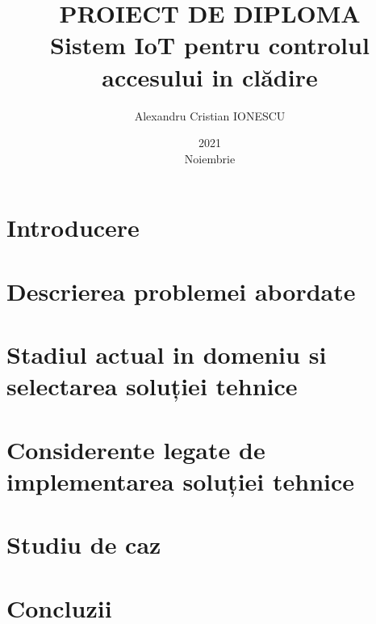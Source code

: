 \documentclass[12pt,romanian]{report}
\title{PROIECT DE DIPLOMA\\Sistem IoT pentru controlul\\accesului in clădire}
\date{2021\\ Noiembrie}
\author{Alexandru Cristian IONESCU}
\begin{document}
\maketitle


\tableofcontents

\chapter{Introducere}


\chapter{Descrierea problemei abordate}


\chapter{Stadiul actual in domeniu si selectarea soluției tehnice}


\chapter{Considerente legate de implementarea soluției tehnice}


\chapter{Studiu de caz}


\chapter{Concluzii}


% 

\clearpage

\printglossary[type=\acronymtype,title={Acronime}]
\printglossary

\printbibliography[heading=bibnumbered]
\end{document}
